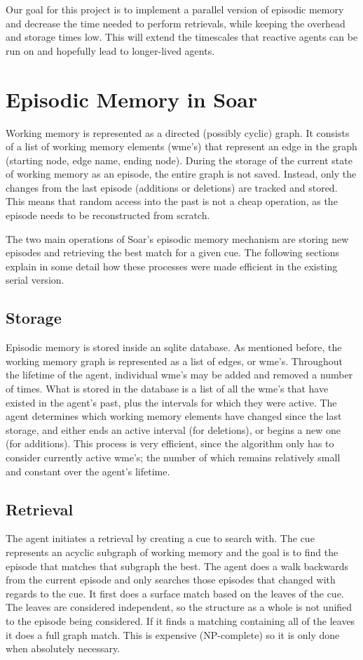 \documentclass[11pt]{article} %
\begin{document}
Our goal for this project is to implement
a parallel version of episodic memory and decrease the time needed to perform
retrievals, while keeping the overhead and storage times low. This will extend the timescales
that reactive agents can be run on and hopefully lead to longer-lived agents. 

\section{Episodic Memory in Soar}
Working memory is represented as a directed (possibly cyclic) graph. It consists
of a list of working memory elements (wme’s) that represent an edge in the graph
(starting node, edge name, ending node). During the storage of the current state
of working memory as an episode, the entire graph is not saved. Instead, only
the changes from the last episode (additions or deletions) are tracked and
stored. This means that random access into the past is not a cheap operation, as
the episode needs to be reconstructed from scratch.

The two main operations of Soar’s episodic memory mechanism are storing new
episodes and retrieving the best match for a given cue. The following sections
explain in some detail how these processes were made efficient in the existing
serial version.

\subsection{Storage}
Episodic memory is stored inside an sqlite database. As mentioned before, the
working memory graph is represented as a list of edges, or wme’s. Throughout the
lifetime of the agent, individual wme’s may be added and removed a number of
times. What is stored in the database is a list of all the wme’s that have
existed in the agent’s past, plus the intervals for which they were active. The
agent determines which working memory elements have changed since the last
storage, and either ends an active interval (for deletions), or begins a new one
(for additions). This process is very efficient, since the algorithm only has to
consider currently active wme’s; the number of which remains relatively small
and constant over the agent’s lifetime.

\subsection {Retrieval}
The agent initiates a retrieval by creating a cue to search with. The cue
represents an acyclic subgraph of working memory and the goal is to find the
episode that matches that subgraph the best. The agent does a walk backwards
from the current episode and only searches those episodes that changed with
regards to the cue. It first does a surface match based on the leaves of the
cue. The leaves are considered independent, so the structure as a whole is not
unified to the episode being considered. If it finds a matching containing all
of the leaves it does a full graph match. This is expensive (NP-complete) so it
is only done when absolutely necessary.
\end{document}
